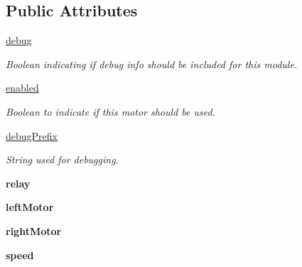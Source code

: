 \subsection*{Public Attributes}
\begin{DoxyCompactItemize}
\item 
\mbox{\label{classmcs_1_1DriveControl_1_1DriveControl_a7cce6f8a44ea9e5fbdac296a7c0d1041}} 
\hyperlink{classmcs_1_1DriveControl_1_1DriveControl_a7cce6f8a44ea9e5fbdac296a7c0d1041}{debug}
\begin{DoxyCompactList}\small\item\em Boolean indicating if debug info should be included for this module. \end{DoxyCompactList}\item 
\hyperlink{classmcs_1_1DriveControl_1_1DriveControl_a3750f3e1b8c2ccb46938cd1b920f305d}{enabled}
\begin{DoxyCompactList}\small\item\em Boolean to indicate if this motor should be used. \end{DoxyCompactList}\item 
\mbox{\label{classmcs_1_1DriveControl_1_1DriveControl_a3d884daf784de995af8d6e22520d838f}} 
\hyperlink{classmcs_1_1DriveControl_1_1DriveControl_a3d884daf784de995af8d6e22520d838f}{debug\+Prefix}
\begin{DoxyCompactList}\small\item\em String used for debugging. \end{DoxyCompactList}\item 
\mbox{\label{classmcs_1_1DriveControl_1_1DriveControl_ae76a18af7ae6f0d24457bcde009f8b88}} 
{\bfseries relay}
\item 
\mbox{\label{classmcs_1_1DriveControl_1_1DriveControl_a74f948d3c09efcec21364ec6b5d9ca08}} 
{\bfseries left\+Motor}
\item 
\mbox{\label{classmcs_1_1DriveControl_1_1DriveControl_a757f7db5ad1f01002d40a0d9bbd2c368}} 
{\bfseries right\+Motor}
\item 
\mbox{\label{classmcs_1_1DriveControl_1_1DriveControl_ab9bbc689d042dd7625efef82d3fb0d5c}} 
{\bfseries speed}
\end{DoxyCompactItemize}


